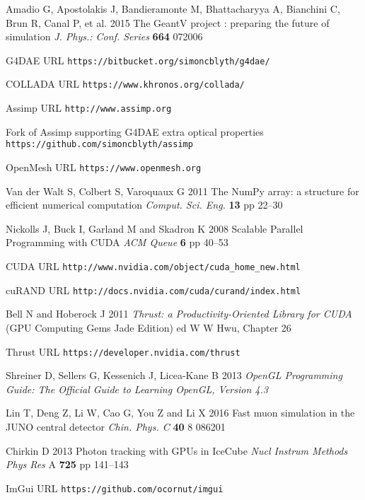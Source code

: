\documentclass[a4paper]{jpconf}
\begin{document}
\begin{thebibliography}{9}
Amadio G, Apostolakis J, Bandieramonte M, Bhattacharyya A, Bianchini C, Brun R, Canal P, et al.
2015
The GeantV project : preparing the future of simulation 
{\it J. Phys.: Conf. Series} {\bf 664} 072006



G4DAE URL {\tt https://bitbucket.org/simoncblyth/g4dae/}

COLLADA URL {\tt https://www.khronos.org/collada/}

Assimp URL {\tt http://www.assimp.org}

Fork of Assimp supporting G4DAE extra optical properties {\tt https://github.com/simoncblyth/assimp}

OpenMesh URL {\tt https://www.openmesh.org}







Van der Walt S, Colbert S, Varoquaux G 
2011 
The NumPy array: a structure for efficient numerical computation
{\it Comput. Sci. Eng.} {\bf 13} pp 22--30

Nickolls J, Buck I, Garland M and Skadron K 
2008
Scalable Parallel Programming with CUDA
{\it ACM Queue} {\bf 6} pp 40--53

CUDA URL {\tt http://www.nvidia.com/object/cuda\_home\_new.html}

cuRAND URL {\tt http://docs.nvidia.com/cuda/curand/index.html}


Bell N and Hoberock J 
2011
{\it Thrust: a Productivity-Oriented Library for CUDA}
(GPU Computing Gems Jade Edition) ed W W Hwu, Chapter 26   

Thrust URL {\tt https://developer.nvidia.com/thrust}

Shreiner D, Sellers G, Kessenich J, Licea-Kane B 
2013
{\it OpenGL Programming Guide: The Official Guide to Learning OpenGL, Version 4.3}













Lin T, Deng Z, Li W, Cao G, You Z and Li X
2016
Fast muon simulation in the JUNO central detector
{\it Chin. Phys. C} {\bf 40} 8 086201

Chirkin D
2013
Photon tracking with GPUs in IceCube
{\it Nucl Instrum Methods Phys Res} A {\bf 725} pp 141--143
%

ImGui URL {\tt https://github.com/ocornut/imgui}

\end{thebibliography}
\end{document}
